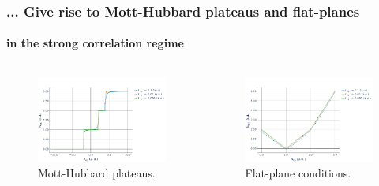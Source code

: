 \documentclass[aspectratio=169]{beamer}
\begin{document}
\begin{frame}
  \frametitle{... Give rise to Mott-Hubbard plateaus and flat-planes}
  \framesubtitle{in the strong correlation regime}
  \begin{center}
    \begin{columns}[onlytextwidth]
      \begin{column}{0.5\textwidth}
        \begin{figure}[ht]
          \centering
          \includegraphics[scale=0.2]{../img/BH-3in3-NvsMu.pdf}
          \caption*{Mott-Hubbard plateaus.}
        \end{figure}
      \end{column}

      \begin{column}{0.5\textwidth}
        \begin{figure}[ht]
          \centering
          \includegraphics[scale=0.2]{../img/BH-3in3-EvsN.pdf}
          \caption*{Flat-plane conditions.}
        \end{figure}
      \end{column}
    \end{columns}
  \end{center}
\end{frame}
\end{document}
